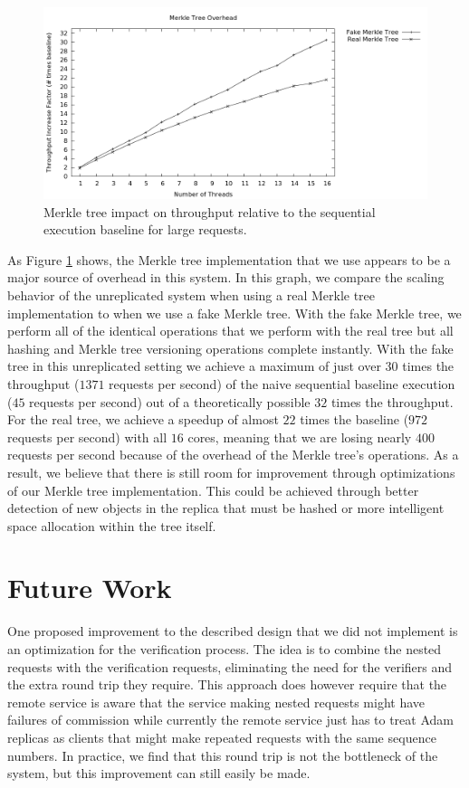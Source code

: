 \documentclass[11pt, oneside]{report}
\begin{document}
\begin{figure}[h]
\centering
\includegraphics[width=1.0\textwidth]{graphs/merkleimpact/graph.png}
\caption{\label{scalingmedmerkletree}Merkle tree impact on throughput relative to the sequential execution baseline for large requests.}
\end{figure}

As Figure \ref{scalingmedmerkletree} shows, the Merkle tree implementation that we use appears to be a major source of overhead in this system.
In this graph, we compare the scaling behavior of the unreplicated system when using a real Merkle tree implementation to when we use a fake Merkle tree.
With the fake Merkle tree, we perform all of the identical operations that we perform with the real tree but all hashing and Merkle tree versioning operations complete instantly.
With the fake tree in this unreplicated setting we achieve a maximum of just over $30$ times the throughput ($1371$ requests per second) of the naive sequential baseline execution ($45$ requests per second) out of a theoretically possible $32$ times the throughput.
For the real tree, we achieve a speedup of almost $22$ times the baseline ($972$ requests per second) with all $16$ cores, meaning that we are losing nearly $400$ requests per second because of the overhead of the Merkle tree's operations.
As a result, we believe that there is still room for improvement through optimizations of our Merkle tree implementation.
This could be achieved through better detection of new objects in the replica that must be hashed or more intelligent space allocation within the tree itself.

\chapter{Future Work}\label{FutureWork}

One proposed improvement to the described design that we did not implement is an optimization for the verification process.
The idea is to combine the nested requests with the verification requests, eliminating the need for the verifiers and the extra round trip they require.
This approach does however require that the remote service is aware that the service making nested requests might have failures of commission while currently the remote service just has to treat Adam replicas as clients that might make repeated requests with the same sequence numbers. 
In practice, we find that this round trip is not the bottleneck of the system, but this improvement can still easily be made.
\end{document}
